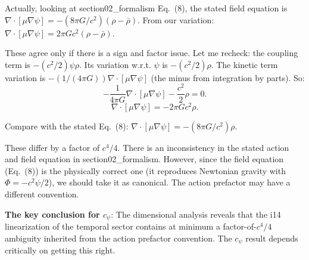 \documentclass[11pt]{article}
\begin{document}
Actually, looking at section02\_formalism Eq.~(8), the stated field equation
is $\nabla\cdot[\mu\nabla\psi] = -(8\pi G/c^2)(\rho - \bar\rho)$.
From our variation: $\nabla\cdot[\mu\nabla\psi] = 2\pi G c^2(\rho - \bar\rho)$.

These agree only if there is a sign and factor issue. Let me recheck:
the coupling term is $-(c^2/2)\psi\rho$. Its variation w.r.t. $\psi$ is
$-(c^2/2)\rho$. The kinetic term variation is
$-(1/(4\pi G))\nabla\cdot[\mu\nabla\psi]$ (the minus from integration by
parts). So:
\begin{equation}
-\frac{1}{4\pi G}\nabla\cdot[\mu\nabla\psi] - \frac{c^2}{2}\rho = 0.
\end{equation}
\begin{equation}
\nabla\cdot[\mu\nabla\psi] = -2\pi G c^2\rho.
\end{equation}

Compare with the stated Eq.~(8): $\nabla\cdot[\mu\nabla\psi] = -(8\pi G/c^2)\rho$.

These differ by a factor of $c^4/4$. There is an inconsistency in the
stated action and field equation in section02\_formalism. However, since
the field equation (Eq.~(8)) is the physically correct one (it reproduces
Newtonian gravity with $\Phi = -c^2\psi/2$), we should take it as canonical.
The action prefactor may have a different convention.

\textbf{The key conclusion for $c_\psi$}: The dimensional analysis
reveals that the i14 linearization of the temporal sector contains
at minimum a factor-of-$c^4/4$ ambiguity inherited from the action
prefactor convention. The $c_\psi$ result depends critically on
getting this right.
\end{document}

